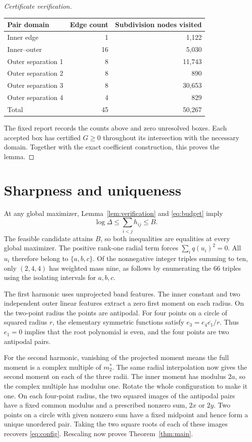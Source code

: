 \documentclass[11pt]{article}
\begin{document}
\begin{proof}[Certificate verification]
\begin{center}
\begin{tabular}{lrr}
\toprule
Pair domain & Edge count & Subdivision nodes visited\\
\midrule
Inner edge & 1 & 1,122\\
Inner--outer & 16 & 5,030\\
Outer separation 1 & 8 & 11,743\\
Outer separation 2 & 8 & 890\\
Outer separation 3 & 8 & 30,653\\
Outer separation 4 & 4 & 829\\
\midrule
Total & 45 & 50,267\\
\bottomrule
\end{tabular}
\end{center}
The fixed report records the counts above and zero unresolved
boxes. Each accepted box has certified \(G\ge0\) throughout its
intersection with the necessary domain. Together with the
exact coefficient construction, this proves the lemma.
\end{proof}

\section{Sharpness and uniqueness}

At any global maximizer, Lemma~\ref{lem:verification} and
\eqref{eq:budget} imply
\[
 \log\Delta\le \sum_{i<j}h_{ij}\le B.
\]
The feasible candidate attains \(B\), so both inequalities
are equalities at every global maximizer. The positive
rank-one radial term forces \(\sum_i q(u_i)^2=0\).
All \(u_i\) therefore belong to \(\{a,b,c\}\).
Of the nonnegative integer triples summing to ten, only
\((2,4,4)\) has weighted mass nine, as follows by enumerating
the 66 triples using the isolating intervals for \(a,b,c\).

The first harmonic uses unprojected band features.
The inner constant and two independent outer linear features
extract a zero first moment on each radius. On the two-point
radius the points are antipodal. For four points on a circle
of squared radius \(r\), the elementary symmetric functions
satisfy \(e_3=e_4\overline{e_1}/r\). Thus \(e_1=0\) implies
that the root polynomial is even, and the four points are two
antipodal pairs.

For the second harmonic, vanishing of the projected moment
means the full moment is a complex multiple of \(m_2^*\).
The same radial interpolation now gives the second moment on
each of the three radii. The inner moment has modulus \(2a\),
so the complex multiple has modulus one. Rotate the whole
configuration to make it one. On each four-point radius, the
two squared images of the antipodal pairs have a fixed common
modulus and a prescribed nonzero sum, \(2x\) or \(2y\).
Two points on a circle with given nonzero sum have a fixed
midpoint and hence form a unique unordered pair. Taking the
two square roots of each of these images recovers
\eqref{eq:config}. Rescaling now proves Theorem~\ref{thm:main}.
\end{document}
